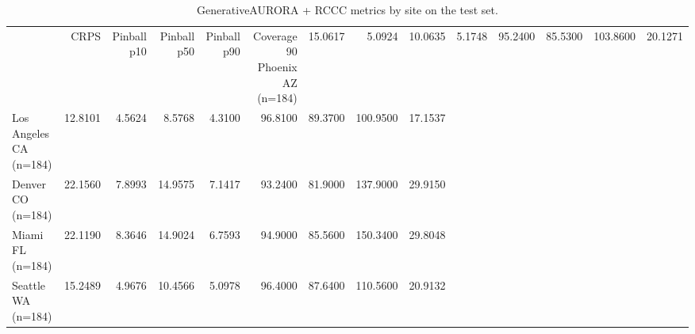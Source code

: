 \begin{table}[ht]
\centering
\caption{GenerativeAURORA + RCCC metrics by site on the test set.}
\label{tab:site}
\begin{tabular}{lrrrrrrrr}
\toprule
 & CRPS & Pinball p10 & Pinball p50 & Pinball p90 & Coverage 90%
\midrule
Phoenix AZ (n=184) & 15.0617 & 5.0924 & 10.0635 & 5.1748 & 95.2400 & 85.5300 & 103.8600 & 20.1271 \\
Los Angeles CA (n=184) & 12.8101 & 4.5624 & 8.5768 & 4.3100 & 96.8100 & 89.3700 & 100.9500 & 17.1537 \\
Denver CO (n=184) & 22.1560 & 7.8993 & 14.9575 & 7.1417 & 93.2400 & 81.9000 & 137.9000 & 29.9150 \\
Miami FL (n=184) & 22.1190 & 8.3646 & 14.9024 & 6.7593 & 94.9000 & 85.5600 & 150.3400 & 29.8048 \\
Seattle WA (n=184) & 15.2489 & 4.9676 & 10.4566 & 5.0978 & 96.4000 & 87.6400 & 110.5600 & 20.9132 \\
\bottomrule
\end{tabular}
\end{table}